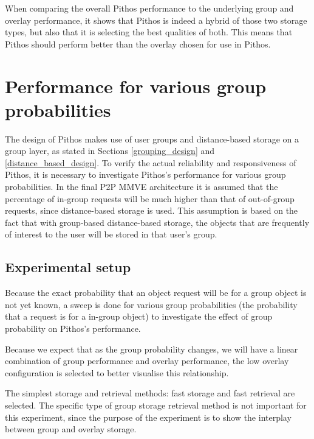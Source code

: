When comparing the overall Pithos performance to the underlying group and overlay performance, it shows that Pithos is indeed a hybrid of those two storage types, but also that it is selecting the best qualities of both. This means that Pithos should perform better than the overlay chosen for use in Pithos.

\section{Performance for various group probabilities}
\label{group_probability_results}

The design of Pithos makes use of user groups and distance-based storage on a group layer, as stated in Sections \ref{grouping_design} and \ref{distance_based_design}. To verify the actual reliability and responsiveness of Pithos, it is necessary to investigate Pithos's performance for various group probabilities. In the final P2P MMVE architecture it is assumed that the percentage of in-group requests will be much higher than that of out-of-group requests, since distance-based storage is used. This assumption is based on the fact that with group-based distance-based storage, the objects that are frequently of interest to the user will be stored in that user's group.

\subsection{Experimental setup}

Because the exact probability that an object request will be for a group object is not yet known, a sweep is done for various group probabilities (the probability that a request is for a in-group object) to investigate the effect of group probability on Pithos's performance.

Because we expect that as the group probability changes, we will have a linear combination of group performance and overlay performance, the low overlay configuration is selected to better visualise this relationship.

The simplest storage and retrieval methods: fast storage and fast retrieval are selected. The specific type of group storage retrieval method is not important for this experiment, since the purpose of the experiment is to show the interplay between group and overlay storage.

